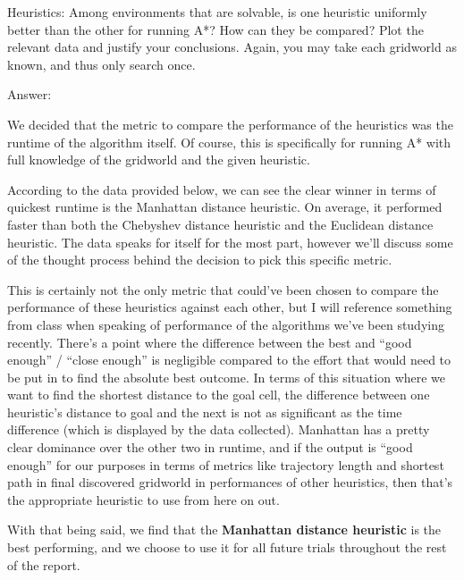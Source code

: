 \documentclass{homeworg}
\begin{document}
\newpage
\exercise*
Heuristics: Among environments that are solvable, is one heuristic uniformly better than the other for running A*? How can they be compared? Plot the relevant data and justify your conclusions. Again, you may take each gridworld as known, and thus only search once.

Answer:

We decided that the metric to compare the performance of the heuristics was the runtime of the algorithm itself. Of course, this is specifically for running A* with full knowledge of the gridworld and the given heuristic.

According to the data provided below, we can see the clear winner in terms of quickest runtime is the Manhattan distance heuristic. On average, it performed faster than both the Chebyshev distance heuristic and the Euclidean distance heuristic. The data speaks for itself for the most part, however we'll discuss some of the thought process behind the decision to pick this specific metric.

This is certainly not the only metric that could’ve been chosen to compare the performance of these heuristics against each other, but I will reference something from class when speaking of performance of the algorithms we've been studying recently. There’s a point where the difference between the best and “good enough” / “close enough” is negligible compared to the effort that would need to be put in to find the absolute best outcome. In terms of this situation where we want to find the shortest distance to the goal cell, the difference between one heuristic’s distance to goal and the next is not as significant as the time difference (which is displayed by the data collected). Manhattan has a pretty clear dominance over the other two in runtime, and if the output is “good enough” for our purposes in terms of metrics like trajectory length and shortest path in final discovered gridworld in performances of other heuristics, then that’s the appropriate heuristic to use from here on out.

With that being said, we find that the \textbf{Manhattan distance heuristic} is the best performing, and we choose to use it for all future trials throughout the rest of the report.
\end{document}
